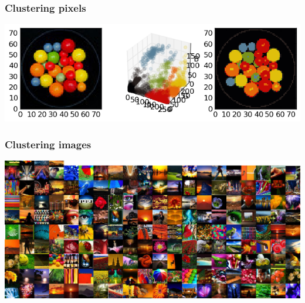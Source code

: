 \begin{frame}
  \frametitle{Clustering pixels}

  \begin{center}
  \includegraphics[width=\textwidth]{../../code/image_data/candy_clustered.png}
  \end{center}

\end{frame}


\begin{frame}
  \frametitle{Clustering images}

  \begin{center}
  \includegraphics[width=\textwidth]{../../code/image_data/flickr_vivid_cluster_0.png}
  \end{center}

\end{frame}
